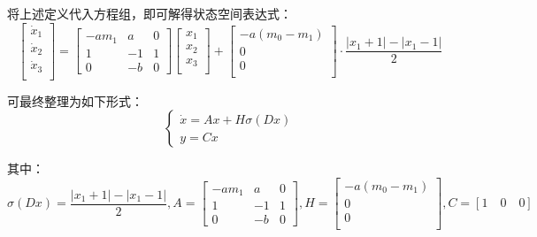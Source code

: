 \documentclass[UTF8]{article}
\begin{document}
将上述定义代入方程组，即可解得状态空间表达式：
\begin{equation*}
	\begin{bmatrix}
		\dot{x}_1 \\
		\dot{x}_2 \\
		\dot{x}_3 \\
	\end{bmatrix} = 
	\begin{bmatrix}
		-am_1 & a & 0 \\
		1 & -1 & 1 \\
		0 & -b & 0
	\end{bmatrix}
	\begin{bmatrix}
		x_1 \\
		x_2 \\
		x_3 \\
	\end{bmatrix} + 
	\begin{bmatrix}
		-a(m_0 - m_1) \\
		0 \\
		0 \\
	\end{bmatrix} \cdot \frac{|x_1 + 1| - |x_1 - 1|}{2}
\end{equation*}

可最终整理为如下形式：
\begin{equation*}
	\begin{cases}
		\dot{x} = Ax + H\sigma(Dx) \\
		y = Cx
	\end{cases}
\end{equation*}

其中：
\begin{equation*}
	\sigma(Dx) = \frac{|x_1 + 1| - |x_1 - 1|}{2},  
	A = \begin{bmatrix}
		-am_1 & a & 0 \\
		1 & -1 & 1 \\
		0 & -b & 0
	\end{bmatrix},  
	H = \begin{bmatrix}
		-a(m_0 - m_1) \\
		0 \\
		0 \\
	\end{bmatrix},  
	C = [1 \quad 0 \quad 0]
\end{equation*}

\end{document}
